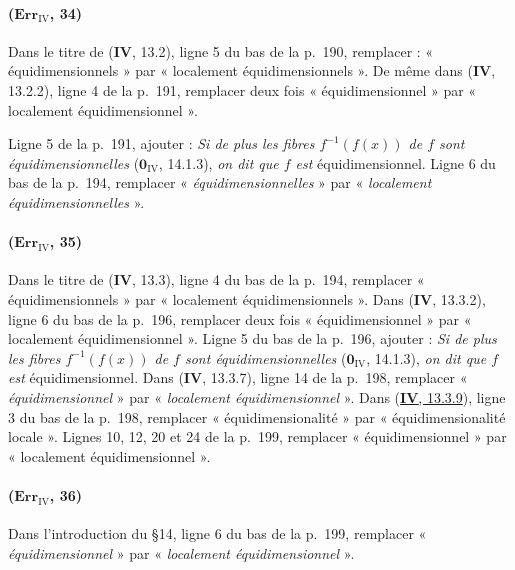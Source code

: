 \paragraph{($\mathbf{Err}_{\mathrm{IV}}$, 34)}
Dans le titre de (\textbf{IV}, 13.2), ligne 5 du bas de la p.~190, remplacer :
« équidimensionnels » par « localement équidimensionnels ». De même
dans (\textbf{IV}, 13.2.2), ligne 4 de la p.~191, remplacer deux fois
« équidimensionnel » par « localement équidimensionnel ».

Ligne 5 de la p.~191, ajouter : \emph{Si de plus les fibres
$f^{-1}(f(x))$ de $f$ sont équidimensionnelles} ($\mathbf{0}_{\mathrm{IV}}$,
14.1.3), \emph{on dit que $f$ est} équidimensionnel. Ligne 6 du bas de la
p.~194, remplacer « \emph{équidimensionnelles} » par « \emph{localement
équidimensionnelles} ».

\paragraph{($\mathbf{Err}_{\mathrm{IV}}$, 35)}
Dans le titre de (\textbf{IV}, 13.3), ligne 4 du bas de la p.~194, remplacer
« équidimensionnels » par « localement équidimensionnels ». Dans
(\textbf{IV}, 13.3.2), ligne 6 du bas de la p.~196, remplacer deux fois
« équidimensionnel » par « localement équidimensionnel ». Ligne 5 du bas
de la p.~196, ajouter : \emph{Si de plus les fibres $f^{-1}(f(x))$ de
$f$ sont équidimensionnelles} ($\mathbf{0}_{\mathrm{IV}}$, 14.1.3), \emph{on dit que
$f$ est} équidimensionnel. Dans (\textbf{IV}, 13.3.7), ligne 14 de la p.~198,
remplacer « \emph{équidimensionnel} » par « \emph{localement équidimensionnel} ».
Dans ({\hyperref[canon-index.ega4.c04.statement.13-3-9]{\textbf{IV}, 13.3.9}}), ligne 3 du
bas de la p.~198, remplacer « équidimensionalité » par
« équidimensionalité locale ». Lignes 10, 12, 20 et 24 de la p.~199,
remplacer « équidimensionnel » par « localement équidimensionnel ».

\paragraph{($\mathbf{Err}_{\mathrm{IV}}$, 36)}
Dans l'introduction du \S14, ligne 6 du bas de la p.~199, remplacer
« \emph{équidimensionnel} » par « \emph{localement équidimensionnel} ».


